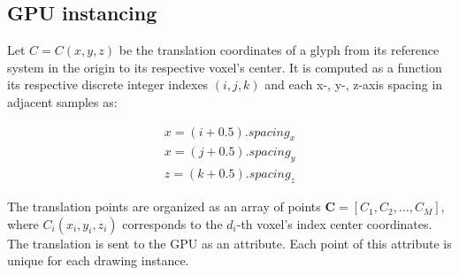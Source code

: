 \documentclass[twoside,twocolumn,10pt]{article}
\begin{document}






\subsection{GPU instancing}

Let $C= C(x, y, z)$ be the translation coordinates of a glyph from its reference system in the origin to its respective voxel's center. It is computed as a function its respective discrete integer indexes $(i, j, k)$ and each x-, y-, z-axis spacing in adjacent samples as:

\begin{align}
 \label{eq::translation}
    x = (i + 0.5).spacing_x \nonumber\\
    x = (j + 0.5).spacing_y \\
    z = (k + 0.5).spacing_z \nonumber
\end{align}


The translation points are organized as an array of points $\bm{C} = [C_1,C_2, \dots, C_M]$, where $C_i(x_i, y_i, z_i)$ corresponds to the $d_i$-th voxel's index center coordinates. The translation is sent to the GPU as an attribute. Each point of this attribute is unique for each drawing instance.




\end{document}
